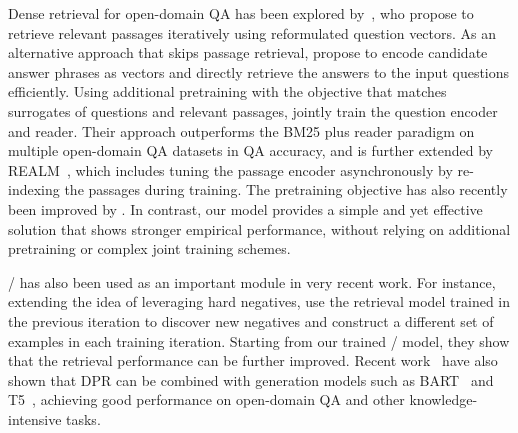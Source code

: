 Dense retrieval for open-domain QA has been explored by~\citet{das2019multi}, who propose to retrieve relevant passages iteratively using reformulated question vectors.
As an alternative approach that skips passage retrieval, \citet{seo2019real} propose to encode candidate answer phrases as vectors and directly retrieve the answers to the input questions efficiently.
Using additional pretraining with the objective that matches surrogates of questions and relevant passages, \citet{lee2019latent} jointly train the question encoder and reader.
Their approach outperforms the BM25 plus reader paradigm on multiple open-domain QA datasets in QA accuracy, and is further extended by REALM~\cite{guu2020realm}, which includes tuning the passage encoder asynchronously by re-indexing the passages during training.
The pretraining objective has also recently been improved by \citet{Xiong2020ProgressivelyPD}.
In contrast, our model provides a simple and yet effective solution that shows stronger empirical performance, without relying on additional pretraining or complex joint training schemes.

\model/ has also been used as an important module in very recent work. For instance, extending the idea of leveraging hard negatives, \citet{Xiong2020ANCE} use the retrieval model trained in the previous iteration to discover new negatives and construct a different set of examples in each training iteration. Starting from our trained \model/ model, they show that the retrieval performance can be further improved. Recent work~\cite{Izacard2020fid, lewis2020rag} have also shown that DPR can be combined with generation models such as BART~\cite{lewis-etal-2020-bart} and T5~\cite{raffel2019T5}, achieving good performance on open-domain QA and other knowledge-intensive tasks.





